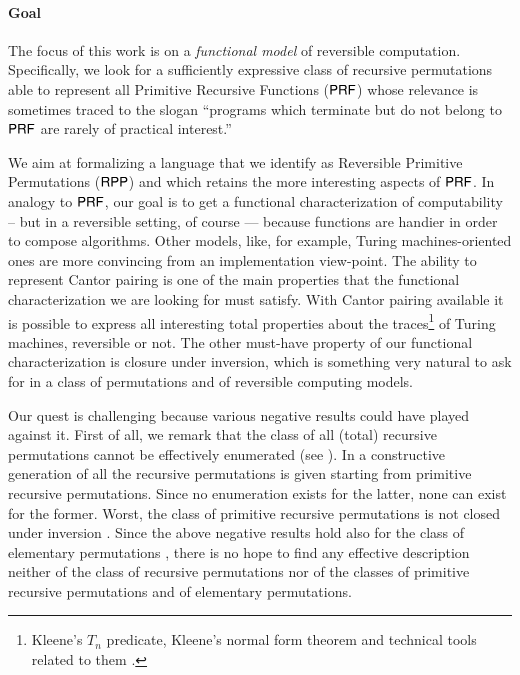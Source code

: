 \paragraph{Goal} 
The focus of this work is on a \emph{functional model} of reversible computation. 
Specifically, we look for a  sufficiently expressive  class of recursive permutations able to represent all
 Primitive Recursive Functions ($ \mathsf{P}\mathsf{RF} $) \cite{rogers1967theory,soare1987book}
whose relevance is sometimes traced to the slogan
``programs which terminate but do not belong to $ \mathsf{P}\mathsf{RF} $ are rarely of practical interest.''


We aim at formalizing a language that we identify as Reversible Primitive Permutations ($ \mathsf{RPP} $) and which 
retains the more interesting aspects of $\mathsf{P}\mathsf{RF}$.
In analogy to $ \mathsf{P}\mathsf{RF} $, our goal is to get a functional characterization of computability
-- but in a reversible setting, of course --- because functions are handier in order to compose 
algorithms. Other models, like, for example, Turing machines-oriented ones are
more convincing from an implementation view-point.
The ability to represent Cantor pairing \cite{rosenberg2009book} is one of the main properties that 
the functional characterization we are looking for must satisfy.
With Cantor pairing available it is possible to express all interesting total properties about the 
traces\footnote{Kleene's $T_n$ predicate, Kleene's normal form theorem and technical tools related to them \cite{cutland1980book,odifreddi1989book,soare1987book}.}
of Turing machines, reversible or not.
The other must-have property of our functional characterization is closure under inversion, which is something
very natural to ask for in a class of permutations and of reversible computing models.

Our quest is challenging because various negative results could have played  against it.
First of all, we remark that the class of all (total) recursive permutations 
cannot be effectively enumerated (see \cite[Exercise 4-6, p.55]{rogers1967theory}). 
In \cite{koz1972ail} a constructive generation of all the recursive permutations is given starting
from primitive recursive permutations. Since no enumeration exists for the latter, none can exist for the former.
Worst, the class of primitive recursive permutations is not closed under inversion \cite{kuznecov50sssr,PaoliniPiccoloRoversiICTCS2015,soare1987book}.
Since the above negative results hold also for the class of elementary permutations 
\cite{cannonito1969jsl,kalimullin03permutations,koz1974ail}, there is no
hope to find any effective description neither of the class of recursive 
permutations nor of the classes of primitive recursive permutations and of elementary permutations.


